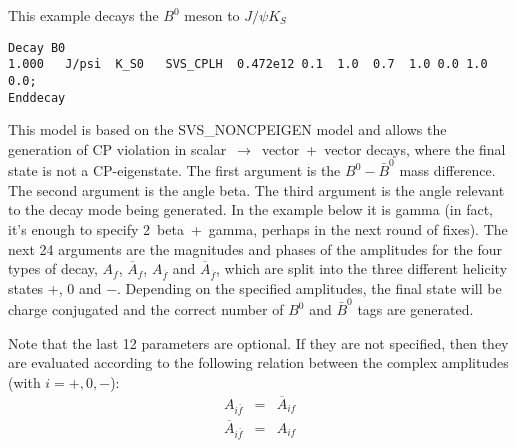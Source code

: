 \Example
This example decays the $B^0$ meson to $J/\psi K_S$
\begin{verbatim}
Decay B0
1.000   J/psi  K_S0   SVS_CPLH  0.472e12 0.1  1.0  0.7  1.0 0.0 1.0 0.0;
Enddecay
\end{verbatim}

\Notes




\label{svvnoncpeigen}



\Expl
This model is based on the SVS\_NONCPEIGEN model and allows the
generation of CP violation in scalar~$\rightarrow$~vector~+~vector
decays, where the final state is not a CP-eigenstate.  The first
argument is the $B^0-\bar B^0$ mass difference. The second argument
is the angle beta.  The third argument is the angle relevant to the
decay mode being generated.  In the example below it is gamma (in
fact, it's enough to specify 2~beta~+~gamma, perhaps in the next
round of fixes).  The next 24 arguments are the magnitudes and phases
of the amplitudes for the four types of decay, $A_f$, $\overline
A_f$, $A_{\overline f}$ and $\overline A_{\overline f}$, which are
split into the three different helicity states +, 0 and $-$.
Depending on the specified amplitudes, the final state will be charge
conjugated and the correct number of $B^0$ and $\bar B^0$ tags are
generated.

Note that the last 12 parameters are optional. If they are not
specified, then they are evaluated according to the following relation
between the complex amplitudes (with $i=+,0,-$):
\begin{eqnarray}
          A_{i \overline f} &=& \overline A_{if} \nonumber\\
\overline A_{i \overline f} &=&           A_{if}  
\label{eq:svv_noncpeigen}
\end{eqnarray}


